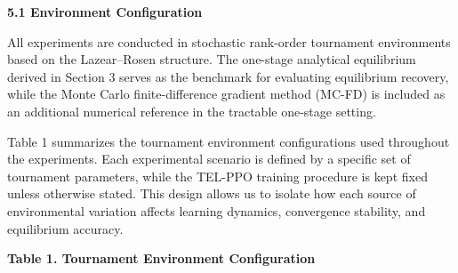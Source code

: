 \documentclass[
]{article}
\begin{document}
\textbf{5.1 Environment Configuration}

All experiments are conducted in stochastic rank-order tournament
environments based on the Lazear--Rosen structure. The one-stage
analytical equilibrium derived in Section 3 serves as the benchmark for
evaluating equilibrium recovery, while the Monte Carlo finite-difference
gradient method (MC-FD) is included as an additional numerical reference
in the tractable one-stage setting.

Table 1 summarizes the tournament environment configurations used
throughout the experiments. Each experimental scenario is defined by a
specific set of tournament parameters, while the TEL-PPO training
procedure is kept fixed unless otherwise stated. This design allows us
to isolate how each source of environmental variation affects learning
dynamics, convergence stability, and equilibrium accuracy.

\textbf{Table 1. Tournament Environment Configuration}
\end{document}

